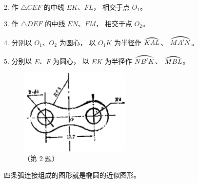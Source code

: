 2. 作 $\triangle CEF$ 的中线 $EK$、$FL$， 相交于点 $O_1$。

3. 作 $\triangle DEF$ 的中线 $EN$、$FM$， 相交于点 $O_2$。

4. 分别以 $O_1$、$O_2$ 为圆心， 以 $O_1K$ 为半径作 $\yuanhu{KAL}$、 $\yuanhu{MA'N}$。

5. 分别以 $E$、$F$ 为圆心， 以 $EK$ 为半径作 $\yuanhu{NB'K}$、 $\yuanhu{MBL}$。

\begin{figure}[htbp]
    \centering
    \begin{minipage}[b]{7cm}
        \centering
        
        \caption{}\label{fig:czjh2-7-62}
    \end{minipage}
    \qquad
    \begin{minipage}[b]{7cm}
        \centering
        \includegraphics[width=5.5cm]{../pic/czjh2-ch7-subsec15-lx-02.png}
        \caption*{（第 2 题）}
    \end{minipage}
\end{figure}


四条弧连接组成的图形就是椭圆的近似图形。

\begin{lianxi}



\end{lianxi}


